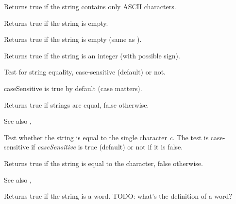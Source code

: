 
Returns true if the string contains only ASCII characters.

\label{wxstringisempty}


Returns true if the string is empty.

\label{wxstringisnull}


Returns true if the string is empty (same as ).

\label{wxstringisnumber}


Returns true if the string is an integer (with possible sign).

\label{wxstringissameas}


Test for string equality, case-sensitive (default) or not.

caseSensitive is true by default (case matters).

Returns true if strings are equal, false otherwise.

See also , 


Test whether the string is equal to the single character {\it c}. The test is
case-sensitive if {\it caseSensitive} is true (default) or not if it is false.

Returns true if the string is equal to the character, false otherwise.

See also , 

\label{wxstringisword}


Returns true if the string is a word. TODO: what's the definition of a word?

\label{wxstringlast}


